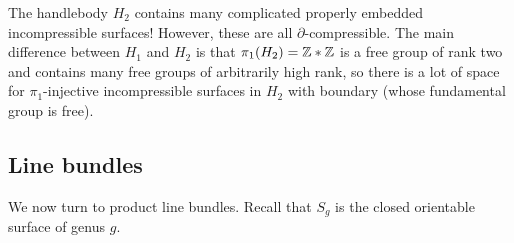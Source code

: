 \begin{warning}
The handlebody $H_2$ contains many complicated properly embedded incompressible surfaces! However, these are all $\partial$-compressible. The main difference between $H_1$ and $H_2$ is that $\pi_1(H_2)=\mathbb{Z}*\mathbb{Z}$ is a free group of rank two and contains many free groups of arbitrarily high rank, so there is a lot of space for $\pi_1$-injective incompressible surfaces in $H_2$ with boundary (whose fundamental group is free).
\end{warning}

\subsection{Line bundles}
We now turn to product line bundles. Recall that $S_g$ is the closed orientable surface of genus $g$. 

